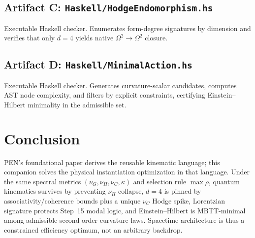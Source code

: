 \documentclass[12pt,a4paper]{article}
\theoremstyle{definition}
\begin{document}
\subsection*{Artifact C: \texttt{Haskell/HodgeEndomorphism.hs}}
Executable Haskell checker. Enumerates form-degree signatures by dimension and verifies that only $d=4$ yields native $\Omega^2\to\Omega^2$ closure.

\subsection*{Artifact D: \texttt{Haskell/MinimalAction.hs}}
Executable Haskell checker. Generates curvature-scalar candidates, computes AST node complexity, and filters by explicit constraints, certifying Einstein--Hilbert minimality in the admissible set.

\begin{center}
\end{center}

\section{Conclusion}

PEN's foundational paper derives the reusable kinematic language; this companion solves the physical instantiation optimization in that language. Under the same spectral metrics $(\nu_G,\nu_H,\nu_C,\kappa)$ and selection rule $\max\rho$, quantum kinematics survives by preventing $\nu_H$ collapse, $d=4$ is pinned by associativity/coherence bounds plus a unique $\nu_C$ Hodge spike, Lorentzian signature protects Step~15 modal logic, and Einstein--Hilbert is MBTT-minimal among admissible second-order curvature laws. Spacetime architecture is thus a constrained efficiency optimum, not an arbitrary backdrop.
\end{document}
